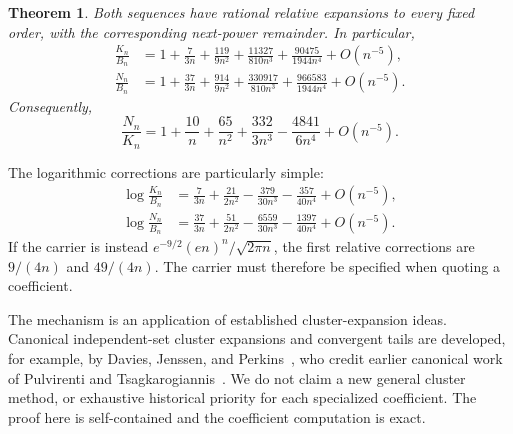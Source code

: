 \documentclass[11pt]{article}
\newtheorem{theorem}{Theorem}
\begin{document}
\begin{theorem}\label{scp:thm:main}
Both sequences have rational relative expansions to every fixed order, with the corresponding next-power remainder. In particular,
\begin{align}
\frac{K_n}{B_n}
 &=1+\frac7{3n}+\frac{119}{9n^2}+\frac{11327}{810n^3}
       +\frac{90475}{1944n^4}+O(n^{-5}),\label{scp:eq:kings}\\
\frac{N_n}{B_n}
 &=1+\frac{37}{3n}+\frac{914}{9n^2}+\frac{330917}{810n^3}
       +\frac{966583}{1944n^4}+O(n^{-5}).\label{scp:eq:knights}
\end{align}
Consequently,
\begin{equation}\label{scp:eq:ratio}
\frac{N_n}{K_n}=1+\frac{10}{n}+\frac{65}{n^2}
 +\frac{332}{3n^3}-\frac{4841}{6n^4}+O(n^{-5}).
\end{equation}
\end{theorem}
The logarithmic corrections are particularly simple:
\begin{align}
\log\frac{K_n}{B_n}
 &=\frac7{3n}+\frac{21}{2n^2}-\frac{379}{30n^3}
 -\frac{357}{40n^4}+O(n^{-5}),\label{scp:eq:klog}\\
\log\frac{N_n}{B_n}
 &=\frac{37}{3n}+\frac{51}{2n^2}-\frac{6559}{30n^3}
 -\frac{1397}{40n^4}+O(n^{-5}).\label{scp:eq:nlog}
\end{align}
If the carrier is instead $e^{-9/2}(en)^n/\sqrt{2\pi n}$, the first relative corrections are $9/(4n)$ and $49/(4n)$. The carrier must therefore be specified when quoting a coefficient.

The mechanism is an application of established cluster-expansion ideas. Canonical independent-set cluster expansions and convergent tails are developed, for example, by Davies, Jenssen, and Perkins~\cite{DJP}, who credit earlier canonical work of Pulvirenti and Tsagkarogiannis~\cite{PT}. We do not claim a new general cluster method, or exhaustive historical priority for each specialized coefficient. The proof here is self-contained and the coefficient computation is exact.
\end{document}
